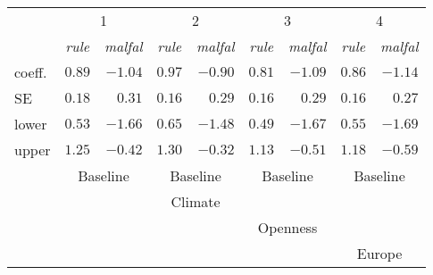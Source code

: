 \begin{tabular}{lrrrrrrrr}
\hline \hline 
& \multicolumn{2}{c}{1} & \multicolumn{2}{c}{2} & \multicolumn{2}{c}{3} & \multicolumn{2}{c}{4}\\ 
& \multicolumn{1}{c}{\emph{rule}} & \multicolumn{1}{c}{\emph{malfal}} & \multicolumn{1}{c}{\emph{rule}} & \multicolumn{1}{c}{\emph{malfal}} & \multicolumn{1}{c}{\emph{rule}} & \multicolumn{1}{c}{\emph{malfal}} & \multicolumn{1}{c}{\emph{rule}} & \multicolumn{1}{c}{\emph{malfal}}\\ 
 \hline 
 
coeff. & $0.89$ & $-1.04$ & $0.97$ & $-0.90$ & $0.81$ & $-1.09$ & $0.86$ & $-1.14$\\ 
SE & $0.18$ & $0.31$ & $0.16$ & $0.29$ & $0.16$ & $0.29$ & $0.16$ & $0.27$\\ 
lower & $0.53$ & $-1.66$ & $0.65$ & $-1.48$ & $0.49$ & $-1.67$ & $0.55$ & $-1.69$\\ 
upper & $1.25$ & $-0.42$ & $1.30$ & $-0.32$ & $1.13$ & $-0.51$ & $1.18$ & $-0.59$\\ 
& \multicolumn{2}{c}{Baseline} & \multicolumn{2}{c}{Baseline} & \multicolumn{2}{c}{Baseline} & \multicolumn{2}{c}{Baseline}\\ 
& \multicolumn{2}{c}{} & \multicolumn{2}{c}{Climate} & \multicolumn{2}{c}{} & \multicolumn{2}{c}{}\\ 
& \multicolumn{2}{c}{} & \multicolumn{2}{c}{} & \multicolumn{2}{c}{Openness} & \multicolumn{2}{c}{}\\ 
& \multicolumn{2}{c}{} & \multicolumn{2}{c}{} & \multicolumn{2}{c}{} & \multicolumn{2}{c}{Europe}\\ 
 \hline
\end{tabular} 
 
 \vspace{2em} 
 
